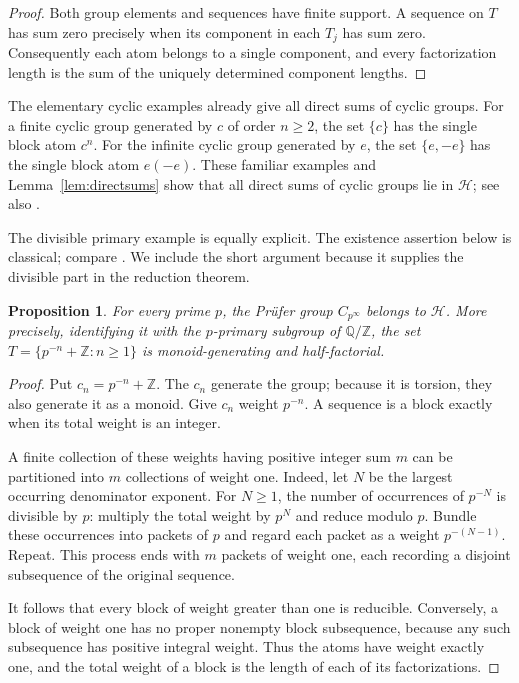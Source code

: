 \documentclass[11pt,reqno]{amsart}
\numberwithin{equation}{section}
\newtheorem{proposition}[theorem]{Proposition}
\theoremstyle{definition}
\theoremstyle{remark}
\newcommand{\Z}{\mathbb Z}
\newcommand{\Q}{\mathbb Q}
\newcommand{\HF}{\mathcal H}
\begin{document}
\begin{proof}
Both group elements and sequences have finite support. A sequence
on $T$ has sum zero precisely when its component in each $T_j$
has sum zero. Consequently each atom belongs to a single
component, and every factorization length is the sum of the
uniquely determined component lengths.
\end{proof}

The elementary cyclic examples already give all direct sums of
cyclic groups. For a finite cyclic group generated by $c$ of order
$n\ge2$, the set $\{c\}$ has the single block atom $c^n$.
For the infinite cyclic group generated by $e$, the set $\{e,-e\}$
has the single block atom $e(-e)$. These familiar examples and
Lemma~\ref{lem:directsums} show that all direct sums of cyclic
groups lie in $\HF$; see also \cite[p.~598]{GaoGeroldinger}.

The divisible primary example is equally explicit. The existence
assertion below is classical; compare
\cite[Corollary~5.4]{GaoGeroldinger}. We include the short argument
because it supplies the divisible part in the reduction theorem.

\begin{proposition}\label{prop:prufer}
For every prime $p$, the Pr\"ufer group $C_{p^\infty}$ belongs to
$\HF$. More precisely, identifying it with the $p$-primary subgroup
of $\Q/\Z$, the set
$T=\{p^{-n}+\Z:n\ge1\}$ is monoid-generating and half-factorial.
\end{proposition}

\begin{proof}
Put $c_n=p^{-n}+\Z$. The $c_n$ generate the group; because it is
torsion, they also generate it as a monoid. Give $c_n$ weight
$p^{-n}$. A sequence is a block exactly when its total weight is
an integer.

A finite collection of these weights having positive integer sum
$m$ can be partitioned into $m$ collections of weight one. Indeed,
let $N$ be the largest occurring denominator exponent. For $N\ge1$,
the number of occurrences of $p^{-N}$ is divisible by $p$: multiply
the total weight by $p^N$ and reduce modulo $p$. Bundle these
occurrences into packets of $p$ and regard each packet as a weight
$p^{-(N-1)}$. Repeat. This process ends with $m$ packets of weight
one, each recording a disjoint subsequence of the original sequence.

It follows that every block of weight greater than one is
reducible. Conversely, a block of weight one has no proper
nonempty block subsequence, because any such subsequence has
positive integral weight. Thus the atoms have weight exactly one,
and the total weight of a block is the length of each of its
factorizations.
\end{proof}
\end{document}
